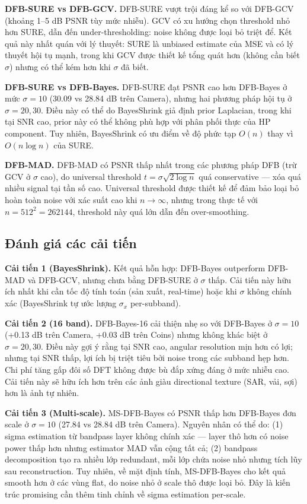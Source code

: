 \textbf{DFB-SURE vs DFB-GCV.}
DFB-SURE vượt trội đáng kể so với DFB-GCV (khoảng 1--5 dB PSNR tùy mức nhiễu). GCV có xu hướng chọn threshold nhỏ hơn SURE, dẫn đến under-thresholding: noise không được loại bỏ triệt để. Kết quả này nhất quán với lý thuyết: SURE là unbiased estimate của MSE và có lý thuyết hội tụ mạnh, trong khi GCV được thiết kế tổng quát hơn (không cần biết $\sigma$) nhưng có thể kém hơn khi $\sigma$ đã biết.

\textbf{DFB-SURE vs DFB-Bayes.}
DFB-SURE đạt PSNR cao hơn DFB-Bayes ở mức $\sigma = 10$ (30.09 vs 28.84 dB trên Camera), nhưng hai phương pháp hội tụ ở $\sigma = 20, 30$. Điều này có thể do BayesShrink giả định prior Laplacian, trong khi tại SNR cao, prior này có thể không phù hợp với phân phối thực của HP component. Tuy nhiên, BayesShrink có ưu điểm về độ phức tạp $O(n)$ thay vì $O(n\log n)$ của SURE.

\textbf{DFB-MAD.}
DFB-MAD có PSNR thấp nhất trong các phương pháp DFB (trừ GCV ở $\sigma$ cao), do universal threshold $t = \sigma\sqrt{2\log n}$ quá conservative --- xóa quá nhiều signal tại tần số cao. Universal threshold được thiết kế để đảm bảo loại bỏ hoàn toàn noise với xác suất cao khi $n \to \infty$, nhưng trong thực tế với $n = 512^2 = 262144$, threshold này quá lớn dẫn đến over-smoothing.

\subsection{Đánh giá các cải tiến}

\textbf{Cải tiến 1 (BayesShrink).}
Kết quả hỗn hợp: DFB-Bayes outperform DFB-MAD và DFB-GCV, nhưng chưa bằng DFB-SURE ở $\sigma$ thấp. Cải tiến này hữu ích nhất khi cần tốc độ tính toán (sản xuất, real-time) hoặc khi $\sigma$ không chính xác (BayesShrink tự ước lượng $\sigma_x$ per-subband).

\textbf{Cải tiến 2 (16 band).}
DFB-Bayes-16 cải thiện nhẹ so với DFB-Bayes ở $\sigma = 10$ (+0.13 dB trên Camera, +0.03 dB trên Coins) nhưng không khác biệt ở $\sigma = 20, 30$. Điều này gợi ý rằng tại SNR cao, angular resolution mịn hơn có lợi; nhưng tại SNR thấp, lợi ích bị triệt tiêu bởi noise trong các subband hẹp hơn. Chi phí tăng gấp đôi số DFT không được bù đắp xứng đáng ở mức nhiễu cao. Cải tiến này sẽ hữu ích hơn trên các ảnh giàu directional texture (SAR, vải, sợi) hơn là ảnh tự nhiên.

\textbf{Cải tiến 3 (Multi-scale).}
MS-DFB-Bayes có PSNR thấp hơn DFB-Bayes đơn scale ở $\sigma = 10$ (27.84 vs 28.84 dB trên Camera). Nguyên nhân có thể do: (1) sigma estimation từ bandpass layer không chính xác --- layer thô hơn có noise power thấp hơn nhưng estimator MAD vẫn cộng tất cả; (2) bandpass decomposition tạo ra nhiều lớp redundant, mỗi lớp chứa noise nhỏ nhưng tích lũy sau reconstruction. Tuy nhiên, về mặt định tính, MS-DFB-Bayes cho kết quả smooth hơn ở các vùng flat, do noise nhỏ ở scale thô được loại bỏ. Đây là kiến trúc promising cần thêm tinh chỉnh về sigma estimation per-scale.

